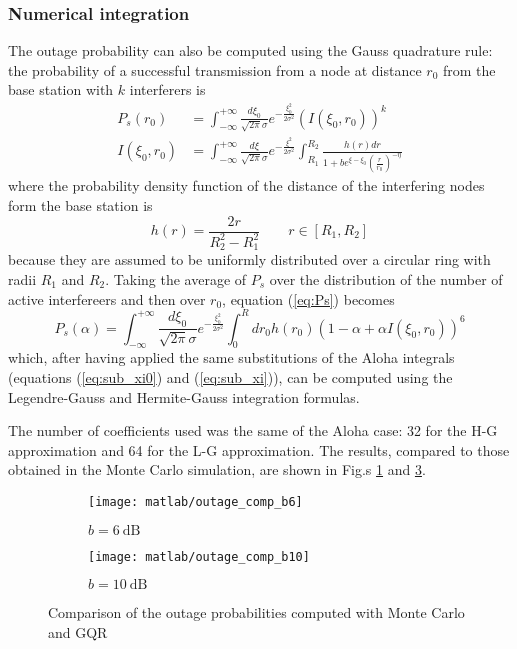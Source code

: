 \documentclass[a4paper,oneside]{article}
\begin{document}
\subsubsection*{Numerical integration}
The outage probability can also be computed using the Gauss quadrature
rule: the probability of a successful transmission from a node at
distance $r_0$ from the base station with $k$ interferers is
\begin{align}
  P_s(r_0) &= \int_{-\infty}^{+\infty} \frac{d\xi_0}{\sqrt{2\pi}\sigma} e^{-\frac{\xi_0^2}{2\sigma^2}}
  \left( I(\xi_0, r_0) \right)^{k}
  \label{eq:Ps} \\
  I(\xi_0, r_0) &= \int_{-\infty}^{+\infty} \frac{d\xi}{\sqrt{2\pi}\sigma} e^{-\frac{\xi^2}{2\sigma^2}}
  \int_{R_1}^{R_2} \frac{h(r)dr}{1 + be^{\xi - \xi_0}\left( \frac{r}{r_0} \right)^{-\eta}}
\end{align}
where the probability density function of the distance of the
interfering nodes form the base station is
\begin{equation}
  h(r) = \frac{2r}{R_2^2 - R_1^2} \qquad r \in [R_1, R_2]
\end{equation}
because they are assumed to be uniformly distributed over a circular
ring with radii $R_1$ and $R_2$.
%
Taking the average of $P_s$ over the distribution of the number of
active interfereers and then over $r_0$, equation (\ref{eq:Ps})
becomes
\begin{equation}
  P_s(\alpha) = \int_{-\infty}^{+\infty} \frac{d\xi_0}{\sqrt{2\pi}\sigma} e^{-\frac{\xi_0^2}{2\sigma^2}}
  \int_0^R dr_0 h(r_0) 
  \left( 1-\alpha+ \alpha I(\xi_0, r_0) \right)^{6}
\end{equation}
which, after having applied the same substitutions of the Aloha
integrals (equations (\ref{eq:sub_xi0}) and (\ref{eq:sub_xi})), can be
computed using the Legendre-Gauss and Hermite-Gauss integration
formulas.

The number of coefficients used was the same of the Aloha case: 32 for
the H-G approximation and 64 for the L-G approximation. The results,
compared to those obtained in the Monte Carlo simulation, are shown in
Fig.s \ref{plot:outage_comp_b6} and \ref{plot:outage_comp_b10}.
\begin{figure}[htbp]
  \centering
  \begin{subfigure}{0.5\textwidth}
    \centering
    \texttt{[image: matlab/outage\_comp\_b6]}
    \caption{$ b = \SI{6}{\dB}$}
    \label{plot:outage_comp_b6}
  \end{subfigure}%
  \begin{subfigure}{0.5\textwidth}
    \centering
    \texttt{[image: matlab/outage\_comp\_b10]}
    \caption{$ b = \SI{10}{\dB}$}
    \label{plot:outage_comp_b10}
  \end{subfigure}
  \caption{Comparison of the outage probabilities computed with Monte
    Carlo and GQR}
\end{figure}
\end{document}
